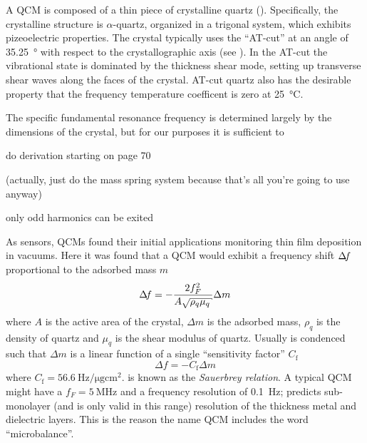 A QCM is composed of a thin piece of crystalline quartz ().
Specifically, the crystalline structure is $\alpha$-quartz, organized in a
trigonal system, which exhibits pizeoelectric properties.  The crystal
typically uses the ``AT-cut'' at an angle of \SI{35.25}{\degree} with
respect to the crystallographic axis (see ).  In the
AT-cut the vibrational state is dominated by the thickness shear mode,
setting up transverse shear waves along the faces of the crystal.  AT-cut
quartz also has the desirable property that the frequency temperature
coefficent is zero at \SI{25}{\celsius}.

The specific fundamental resonance frequency is determined largely by the
dimensions of the crystal, but for our purposes it is sufficient to 

do derivation starting on page 70

(actually, just do the mass spring system because that's all you're going
to use anyway)

only odd harmonics can be exited


As sensors, QCMs found their initial applications monitoring thin film
deposition in vacuums.  Here it was found that a QCM would exhibit a
frequency shift $\Delta\!f$ proportional to the adsorbed mass $m$
\begin{equation}
 \df=-\frac{2f_{F}^{2}}{A\sqrt{\rho_{q}\mu_{q}}}\Delta m
 \label{eqn:sauerbrey}
\end{equation}
where $A$ is the active area of the crystal, $\Delta m$ is the adsorbed
mass, $\rho_{q}$ is the density of quartz and $\mu_{q}$ is the shear
modulus of quartz. Usually  is condenced such that
$\Delta m$ is a linear function of a single ``sensitivity factor''
$C_\mathrm{f}$
\begin{equation}
 \Delta f=-C_{\text{f}}\Delta m
\end{equation}
where $C_{\text{f}}=\SI{56.6}{\hertz\per\micro\gram\centi\meter\squared}$.
 is known as the
\textit{Sauerbrey relation}.  A typical QCM might have a
$f_F=\SI{5}{\mega\hertz}$ and a frequency resolution of \SI{0.1}{\hertz};
 predicts sub-monolayer (and is only valid in this
range) resolution of the thickness
metal and dielectric layers.  This is the reason the name QCM includes the
word ``microbalance''.


